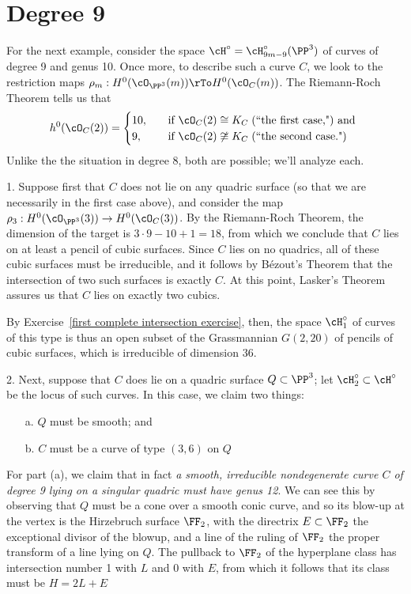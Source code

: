 \section{Degree 9}

For the next example, consider the space $\cH^\circ = \cH^\circ_{9m-9}(\PP^3)$ of curves of degree 9 and genus 10. Once more, to describe such a curve $C$, we look to the restriction maps $\rho_m: H^0(\cO_{\PP^3}(m)) \rTo H^0(\cO_C(m))$. The Riemann-Roch Theorem tells us that
\begin{align*}
h^0(\cO_C(2)) =
\begin{cases}
10, \quad &\text{if } \cO_C(2) \cong K_C \; \text{(``the first case,") and } \\
9,  \quad &\text{if } \cO_C(2) \not\cong K_C  \; \text{(``the second case.")}
\end{cases}
\end{align*}
Unlike the the situation in degree 8, both are possible; we'll analyze each.

1. Suppose first that $C$ does not lie on any quadric surface (so that we are necessarily in the first case above), and consider the map $\rho_3 : H^0(\cO_{\PP^3}(3)) \to H^0(\cO_C(3))$. By the Riemann-Roch Theorem, the dimension of the target is $3\cdot 9 - 10 + 1 = 18$, from which we conclude that $C$ lies on at least a pencil of cubic surfaces. Since $C$ lies on no quadrics, all of these cubic surfaces must be irreducible, and it follows by B\'ezout's Theorem that the intersection of two such surfaces is exactly $C$. At this point, Lasker's Theorem assures us that $C$ lies on exactly two cubics.

By Exercise~\ref{first complete intersection exercise}, then, the space $\cH^\circ_1$ of curves of this type is thus an open subset of the Grassmannian $G(2,20)$ of pencils of cubic surfaces, which is irreducible of dimension 36.

2. Next, suppose that $C$ does lie on a quadric surface $Q \subset \PP^3$; let $\cH^\circ_2 \subset \cH^\circ$ be the locus of such curves. In this case, we claim two things:
\begin{enumerate}
\item[a.] $Q$ must be smooth; and
\item[b.] $C$ must be a curve of type $(3,6)$ on $Q$
\end{enumerate}

For part (a), we claim that in fact \emph{a smooth, irreducible nondegenerate curve $C$ of degree 9 lying on a singular quadric must have genus 12}. We can see this by observing that $Q$ must be a cone over a smooth conic curve, and so its blow-up at the vertex is the Hirzebruch surface $\FF_2$, with the directrix $E \subset \FF_2$ the exceptional divisor of the blowup, and a line of the ruling of $\FF_2$ the proper transform of a line lying on $Q$. The pullback to $\FF_2$ of the hyperplane class has intersection number 1 with $L$ and 0 with $E$, from which it follows that its class must  be $H = 2L + E$

